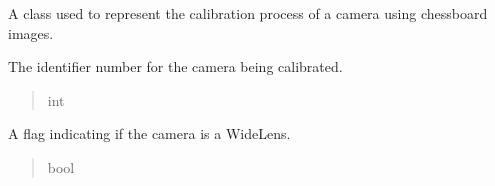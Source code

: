 \documentclass[letterpaper,10pt,english]{sphinxmanual}
\begin{document}
\begin{fulllineitems}
\label{\detokenize{CameraUtils:CameraUtils.Camera}}
\pysigstartsignatures
{}
\pysigstopsignatures
\sphinxAtStartPar
A class used to represent the calibration process of a camera using chessboard images.

\begin{fulllineitems}
\label{\detokenize{CameraUtils:CameraUtils.Camera.camera_number}}
\pysigstartsignatures
{}
\pysigstopsignatures
\sphinxAtStartPar
The identifier number for the camera being calibrated.
\begin{quote}\begin{description}
\sphinxAtStartPar
int

\end{description}\end{quote}

\end{fulllineitems}


\begin{fulllineitems}
\label{\detokenize{CameraUtils:CameraUtils.Camera.FISHEYE}}
\pysigstartsignatures
{}
\pysigstopsignatures
\sphinxAtStartPar
A flag indicating if the camera is a WideLens.
\begin{quote}\begin{description}
\sphinxAtStartPar
bool

\end{description}\end{quote}

\end{fulllineitems}



\end{fulllineitems}
\end{document}
